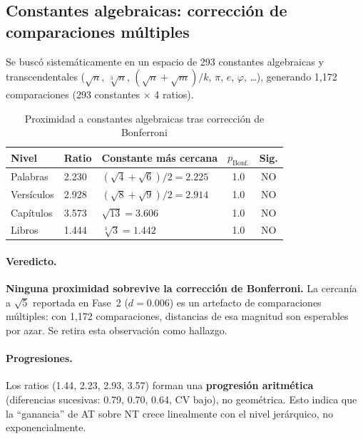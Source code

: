 \documentclass[12pt,a4paper]{article}
\begin{document}
\subsection{Constantes algebraicas: correcci\'on de comparaciones m\'ultiples}

Se busc\'o sistem\'aticamente en un espacio de 293 constantes algebraicas y
transcendentales ($\sqrt{n}$, $\sqrt[3]{n}$, $(\sqrt{n}+\sqrt{m})/k$,
$\pi$, $e$, $\varphi$, \ldots), generando 1,172 comparaciones (293 constantes $\times$ 4 ratios).

\begin{table}[H]
\centering
\caption{Proximidad a constantes algebraicas tras correcci\'on de Bonferroni}
\label{tab:bonferroni}
\begin{tabular}{lllcc}
\toprule
\textbf{Nivel} & \textbf{Ratio} & \textbf{Constante m\'as cercana} & \textbf{$p_{\text{Bonf.}}$} & \textbf{Sig.} \\
\midrule
Palabras     & 2.230 & $(\sqrt{4}+\sqrt{6})/2 = 2.225$ & 1.0 & NO \\
Vers\'iculos & 2.928 & $(\sqrt{8}+\sqrt{9})/2 = 2.914$ & 1.0 & NO \\
Cap\'itulos  & 3.573 & $\sqrt{13} = 3.606$              & 1.0 & NO \\
Libros       & 1.444 & $\sqrt[3]{3} = 1.442$            & 1.0 & NO \\
\bottomrule
\end{tabular}
\end{table}

\paragraph{Veredicto.}
\textbf{Ninguna proximidad sobrevive la correcci\'on de Bonferroni.}
La cercan\'ia a $\sqrt{5}$ reportada en Fase~2 ($d = 0.006$) es un artefacto
de comparaciones m\'ultiples: con 1,172 comparaciones, distancias de esa magnitud
son esperables por azar. Se retira esta observaci\'on como hallazgo.

\paragraph{Progresiones.}
Los ratios (1.44, 2.23, 2.93, 3.57) forman una \textbf{progresi\'on aritm\'etica}
(diferencias sucesivas: 0.79, 0.70, 0.64, CV bajo), no geom\'etrica.
Esto indica que la ``ganancia'' de AT sobre NT crece linealmente con el nivel
jer\'arquico, no exponencialmente.
\end{document}

